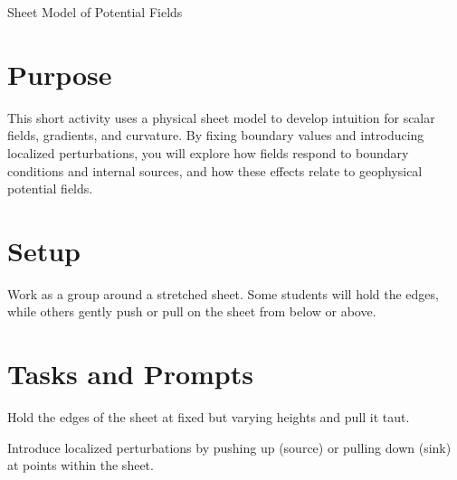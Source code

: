 \begin{activity}{Sheet Model of Potential Fields}

\section{Purpose}
This short activity uses a physical sheet model to develop intuition for scalar fields, gradients, and curvature. By fixing boundary values and introducing localized perturbations, you will explore how fields respond to boundary conditions and internal sources, and how these effects relate to geophysical potential fields.

\section{Setup}
Work as a group around a stretched sheet. Some students will hold the edges, while others gently push or pull on the sheet from below or above.

\section{Tasks and Prompts}

\begin{questions}
    Hold the edges of the sheet at fixed but varying heights and pull it taut.

    Introduce localized perturbations by pushing up (source) or pulling down (sink) at points within the sheet.
\end{questions}
\end{activity}
